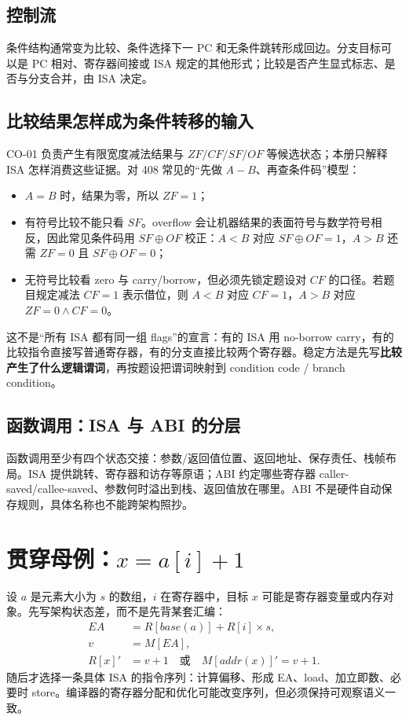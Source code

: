 \documentclass[UTF8,fontset=fandol,11pt,a4paper]{ctexart}
\begin{document}
\subsection{控制流}
条件结构通常变为比较、条件选择下一 PC 和无条件跳转形成回边。分支目标可以是 PC 相对、寄存器间接或 ISA 规定的其他形式；比较是否产生显式标志、是否与分支合并，由 ISA 决定。

\subsection{比较结果怎样成为条件转移的输入}
CO-01 负责产生有限宽度减法结果与 $ZF/CF/SF/OF$ 等候选状态；本册只解释 ISA 怎样消费这些证据。对 408 常见的“先做 $A-B$、再查条件码”模型：
\begin{itemize}
  \item $A=B$ 时，结果为零，所以 $ZF=1$；
  \item 有符号比较不能只看 $SF$。overflow 会让机器结果的表面符号与数学符号相反，因此常见条件码用 $SF\oplus OF$ 校正：$A<B$ 对应 $SF\oplus OF=1$，$A>B$ 还需 $ZF=0$ 且 $SF\oplus OF=0$；
  \item 无符号比较看 zero 与 carry/borrow，但必须先锁定题设对 $CF$ 的口径。若题目规定减法 $CF=1$ 表示借位，则 $A<B$ 对应 $CF=1$，$A>B$ 对应 $ZF=0\land CF=0$。
\end{itemize}
这不是“所有 ISA 都有同一组 flags”的宣言：有的 ISA 用 no-borrow carry，有的比较指令直接写普通寄存器，有的分支直接比较两个寄存器。稳定方法是先写\textbf{比较产生了什么逻辑谓词}，再按题设把谓词映射到 condition code / branch condition。

\subsection{函数调用：ISA 与 ABI 的分层}
函数调用至少有四个状态交接：参数/返回值位置、返回地址、保存责任、栈帧布局。ISA 提供跳转、寄存器和访存等原语；ABI 约定哪些寄存器 caller-saved/callee-saved、参数何时溢出到栈、返回值放在哪里。ABI 不是硬件自动保存规则，具体名称也不能跨架构照抄。

\begin{center}

\end{center}

\section{贯穿母例：\texorpdfstring{$x=a[i]+1$}{x=a[i]+1}}

设 $a$ 是元素大小为 $s$ 的数组，$i$ 在寄存器中，目标 $x$ 可能是寄存器变量或内存对象。先写架构状态差，而不是先背某套汇编：
\[
\begin{aligned}
EA&=R[base(a)]+R[i]\times s,\\
v&=M[EA],\\
R[x]'&=v+1 \quad\text{或}\quad M[addr(x)]'=v+1.
\end{aligned}
\]
随后才选择一条具体 ISA 的指令序列：计算偏移、形成 EA、load、加立即数、必要时 store。编译器的寄存器分配和优化可能改变序列，但必须保持可观察语义一致。
\end{document}
